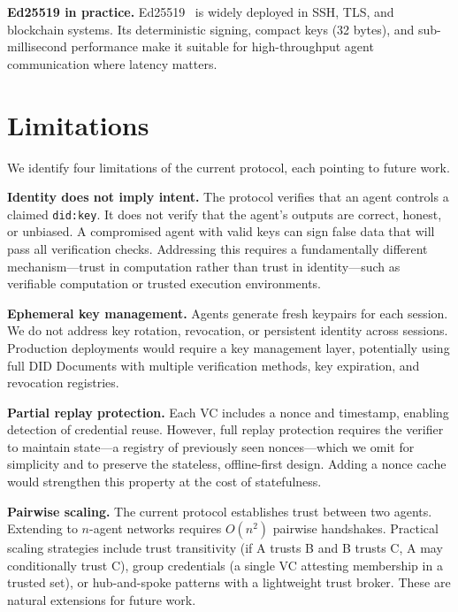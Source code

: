 \documentclass[11pt]{article}
\newcommand{\didkey}{\texttt{did:key}}
\begin{document}
\textbf{Ed25519 in practice.} Ed25519~\cite{ed25519} is widely deployed in SSH, TLS, and blockchain systems. Its deterministic signing, compact keys (32 bytes), and sub-millisecond performance make it suitable for high-throughput agent communication where latency matters.

\section{Limitations}

We identify four limitations of the current protocol, each pointing to future work.

\textbf{Identity does not imply intent.} The protocol verifies that an agent controls a claimed \didkey{}. It does not verify that the agent's outputs are correct, honest, or unbiased. A compromised agent with valid keys can sign false data that will pass all verification checks. Addressing this requires a fundamentally different mechanism---trust in computation rather than trust in identity---such as verifiable computation or trusted execution environments.

\textbf{Ephemeral key management.} Agents generate fresh keypairs for each session. We do not address key rotation, revocation, or persistent identity across sessions. Production deployments would require a key management layer, potentially using full DID Documents with multiple verification methods, key expiration, and revocation registries.

\textbf{Partial replay protection.} Each VC includes a nonce and timestamp, enabling detection of credential reuse. However, full replay protection requires the verifier to maintain state---a registry of previously seen nonces---which we omit for simplicity and to preserve the stateless, offline-first design. Adding a nonce cache would strengthen this property at the cost of statefulness.

\textbf{Pairwise scaling.} The current protocol establishes trust between two agents. Extending to $n$-agent networks requires $O(n^2)$ pairwise handshakes. Practical scaling strategies include trust transitivity (if A trusts B and B trusts C, A may conditionally trust C), group credentials (a single VC attesting membership in a trusted set), or hub-and-spoke patterns with a lightweight trust broker. These are natural extensions for future work.
\end{document}
